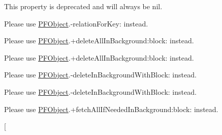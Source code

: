 \begin{DoxyRefList}
This property is deprecated and will always be nil.  
\item[\label{deprecated__deprecated000027}%
\hypertarget{deprecated__deprecated000027}{}%
Member \hyperlink{interface_p_f_object_a5fcd143c041166de62dce229299f6354}{\mbox{[}P\+F\+Object relationfor\+Key\+:\mbox{]}} ]Please use {\ttfamily \hyperlink{interface_p_f_object}{P\+F\+Object}.-\/relation\+For\+Key\+:} instead.  
\item[\label{deprecated__deprecated000026}%
\hypertarget{deprecated__deprecated000026}{}%
\hyperlink{category_p_f_object_07_deprecated_08_a312996cea1a17a6f4bbdfde07f4891a1}{\mbox{[}P\+F\+Object(Deprecated) delete\+All\+In\+Background\+:target\+:selector\+:\mbox{]}} ]Please use {\ttfamily \hyperlink{interface_p_f_object}{P\+F\+Object}.+delete\+All\+In\+Background\+:block\+:} instead.  
\item[\label{deprecated__deprecated000026}%
\hypertarget{deprecated__deprecated000026}{}%
\hyperlink{category_p_f_object_07_deprecated_08_a312996cea1a17a6f4bbdfde07f4891a1}{\mbox{[}P\+F\+Object(Deprecated) delete\+All\+In\+Background\+:target\+:selector\+:\mbox{]}} ]Please use {\ttfamily \hyperlink{interface_p_f_object}{P\+F\+Object}.+delete\+All\+In\+Background\+:block\+:} instead.  
\item[\label{deprecated__deprecated000025}%
\hypertarget{deprecated__deprecated000025}{}%
\hyperlink{category_p_f_object_07_deprecated_08_acdf9948630cfbfb6a2caa0aecfbf58cf}{\mbox{[}P\+F\+Object(Deprecated) delete\+In\+Background\+With\+Target\+:selector\+:\mbox{]}} ]Please use {\ttfamily \hyperlink{interface_p_f_object}{P\+F\+Object}.-\/delete\+In\+Background\+With\+Block\+:} instead.  
\item[\label{deprecated__deprecated000025}%
\hypertarget{deprecated__deprecated000025}{}%
\hyperlink{category_p_f_object_07_deprecated_08_acdf9948630cfbfb6a2caa0aecfbf58cf}{\mbox{[}P\+F\+Object(Deprecated) delete\+In\+Background\+With\+Target\+:selector\+:\mbox{]}} ]Please use {\ttfamily \hyperlink{interface_p_f_object}{P\+F\+Object}.-\/delete\+In\+Background\+With\+Block\+:} instead.  
\item[\label{deprecated__deprecated000024}%
\hypertarget{deprecated__deprecated000024}{}%
\hyperlink{category_p_f_object_07_deprecated_08_aa783e119f260f5e8598abb0564359318}{\mbox{[}P\+F\+Object(Deprecated) fetch\+All\+If\+Needed\+In\+Background\+:target\+:selector\+:\mbox{]}} ]Please use {\ttfamily \hyperlink{interface_p_f_object}{P\+F\+Object}.+fetch\+All\+If\+Needed\+In\+Background\+:block\+:} instead.  
\item[\label{deprecated__deprecated000024}%

\end{DoxyRefList}
